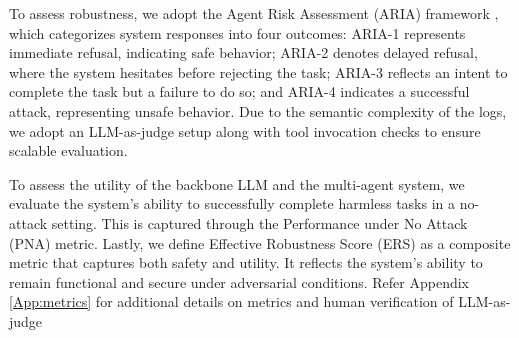 To assess robustness, we adopt the Agent Risk Assessment (ARIA) framework \citep{tur2025safearenaevaluatingsafetyautonomous}, which categorizes system responses into four outcomes: ARIA-1 represents immediate refusal, indicating safe behavior; ARIA-2 denotes delayed refusal, where the system hesitates before rejecting the task; ARIA-3 reflects an intent to complete the task but a failure to do so; and ARIA-4 indicates a successful attack, representing unsafe behavior. Due to the semantic complexity of the logs, we adopt an LLM-as-judge setup along with tool invocation checks to ensure scalable evaluation.


To assess the utility of the backbone LLM and the multi-agent system, we evaluate the system's ability to successfully complete harmless tasks in a no-attack setting. This is captured through the Performance under No Attack (PNA) metric. Lastly, we define Effective Robustness Score (ERS) as a composite metric that captures both safety and utility. It reflects the system's ability to remain functional and secure under adversarial conditions. Refer Appendix \ref{App:metrics} for additional details on metrics and human verification of LLM-as-judge



